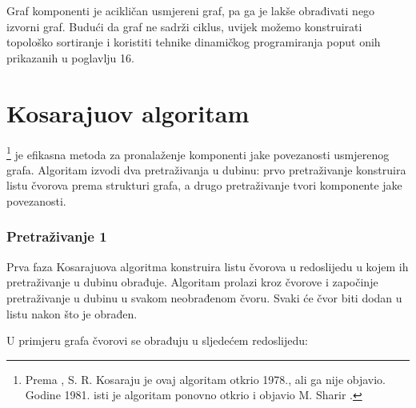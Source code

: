 Graf komponenti je acikličan usmjereni graf,
pa ga je lakše obrađivati nego izvorni graf.
Budući da graf ne sadrži ciklus,
uvijek možemo konstruirati topološko sortiranje i
koristiti tehnike dinamičkog programiranja poput onih
prikazanih u poglavlju 16.

\section{Kosarajuov algoritam}


\footnote{Prema \cite{aho83},
S. R. Kosaraju je ovaj algoritam otkrio 1978.,
ali ga nije objavio. Godine 1981. isti je algoritam ponovno otkrio
i objavio M. Sharir \cite{sha81}.} je efikasna
metoda za pronalaženje komponenti jake povezanosti
usmjerenog grafa.
Algoritam izvodi dva pretraživanja u dubinu:
prvo pretraživanje konstruira listu čvorova
prema strukturi grafa,
a drugo pretraživanje tvori komponente jake povezanosti.

\subsubsection{Pretraživanje 1}

Prva faza Kosarajuova algoritma konstruira
listu čvorova u redoslijedu u kojem ih
pretraživanje u dubinu obrađuje.
Algoritam prolazi kroz čvorove
i započinje pretraživanje u dubinu u svakom 
neobrađenom čvoru.
Svaki će čvor biti dodan u listu
nakon što je obrađen.

U primjeru grafa čvorovi se obrađuju
u sljedećem redoslijedu:
\begin{center}
\end{center}

